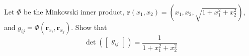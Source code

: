 \documentclass[10pt]{article}
\title{}
\date{}
\begin{document}
Let $\Phi$ be the Minkowski inner product, \(\mathbf r(x_1,x_2) = \left(x_1,x_2, \sqrt{1+x_1^2+x_2^2}\right)\), and $g_{ij} = \Phi(\mathbf r_{x_i}, \mathbf r_{x_j})$. Show that 
\[
\det{\left(
\begin{bmatrix}
g_{ij}
\end{bmatrix}\right)} = \frac{1}{{1+x_1^2+x_2^2}}
\]
\end{document}
